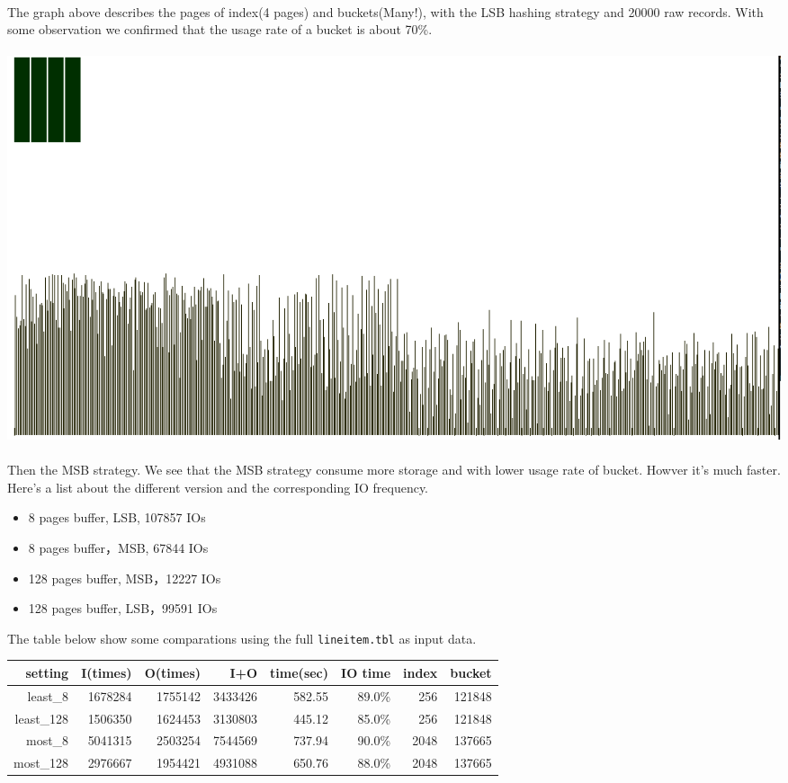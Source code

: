 \documentclass[a4paper, 12pt]{article}
\begin{document}
        \paragraph{}
            The graph above describes the pages of index(4 pages) and buckets(Many!), with the LSB hashing strategy and 20000 raw records. With some observation we confirmed that the usage rate of a bucket is about 70\%. 
        \paragraph{} \includegraphics[scale=0.4]{img/pic20000_h.png}
        \paragraph{}
            Then the MSB strategy. We see that the MSB strategy consume more storage and with lower usage rate of bucket. Howver it's much faster. Here's a list about the different version and the corresponding IO frequency.
        \begin{itemize}
            \item 8 pages buffer, LSB, 107857 IOs
            \item 8 pages buffer，MSB, 67844 IOs
            \item 128 pages buffer, MSB，12227 IOs
            \item 128 pages buffer, LSB，99591 IOs
        \end{itemize}

        The table below show some comparations using the full \verb|lineitem.tbl| as input data.

        \begin{tabular}[h]{|r|r|r|r|r|r|r|r|}
            \hline
            setting & I(times) & O(times) & I+O & time(sec) & IO time& index& bucket\\
            \hline
            least\_8 & 1678284 & 1755142 & 3433426 & 582.55& 89.0\% & 256 & 121848 \\
            least\_128 & 1506350 & 1624453& 3130803& 445.12& 85.0\% & 256& 121848 \\
            most\_8 & 5041315& 2503254& 7544569& 737.94&90.0\% & 2048& 137665\\
            most\_128 & 2976667& 1954421&4931088& 650.76&88.0\% & 2048& 137665\\
            \hline
        \end{tabular}
\end{document}
